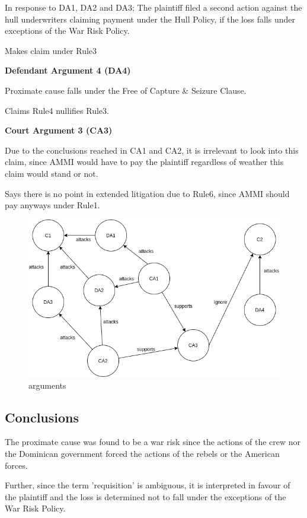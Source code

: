         \newcommand{\claimTwoDefinition}{In response to DA1, DA2 and DA3; The plaintiff filed a second action against the hull underwriters claiming payment under the Hull Policy, if the loss falls under exceptions of the War Risk Policy.}
    
        \claimTwoDefinition
        
        Makes claim under Rule3
        
        \textbf{Defendant Argument 4 (DA4)}
        
            Proximate cause falls under the Free of Capture \& Seizure Clause.
            
            Claims Rule4 nullifies Rule3.
        
        \textbf{Court Argument 3 (CA3)}
        
            Due to the conclusions reached in CA1 and CA2, it is irrelevant to look into this claim, since AMMI would have to pay the plaintiff regardless of weather this claim would stand or not.
            
            Says there is no point in extended litigation due to Rule6, since AMMI should pay anyways under Rule1.

\begin{figure}[H]
  \centering
  \includegraphics[width=5in]{figures/arguments.png}
  \caption[Arguments for claim 1]{\small arguments}
  \label{fig:monitoring-test}
\end{figure}

\subsection{Conclusions}

The proximate cause was found to be a war risk since the actions of the crew nor the Dominican government forced the actions of the rebels or the American forces.

Further, since the term 'requisition' is ambiguous, it is interpreted in favour of the plaintiff and the loss is determined not to fall under the exceptions of the War Risk Policy. 

\FloatBarrier
